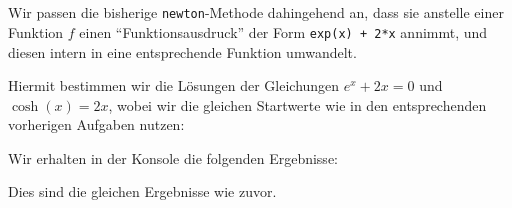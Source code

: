\section{}

Wir passen die bisherige \texttt{newton}-Methode dahingehend an, dass sie anstelle einer Funktion $f$ einen \enquote{Funktionsausdruck} der Form \texttt{exp(x) + 2*x} annimmt, und diesen intern in eine entsprechende Funktion umwandelt.



Hiermit bestimmen wir die Lösungen der Gleichungen $e^x + 2x = 0$ und $\cosh(x) = 2x$, wobei wir die gleichen Startwerte wie in den entsprechenden vorherigen Aufgaben nutzen:



Wir erhalten in der Konsole die folgenden Ergebnisse:


Dies sind die gleichen Ergebnisse wie zuvor.
